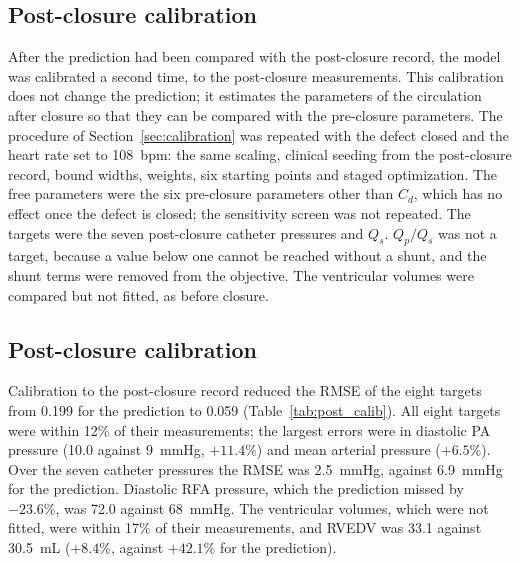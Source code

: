 %
%   


\subsection{Post-closure calibration}
\label{sec:post_calib_methods}
After the prediction had been compared with the post-closure record, the model was calibrated a second time, to the post-closure measurements. This calibration does not change the prediction; it estimates the parameters of the circulation after closure so that they can be compared with the pre-closure parameters. The procedure of Section~\ref{sec:calibration} was repeated with the defect closed and the heart rate set to 108~bpm: the same scaling, clinical seeding from the post-closure record, bound widths, weights, six starting points and staged optimization. The free parameters were the six pre-closure parameters other than $C_d$, which has no effect once the defect is closed; the sensitivity screen was not repeated. The targets were the seven post-closure catheter pressures and $Q_s$. $Q_p/Q_s$ was not a target, because a value below one cannot be reached without a shunt, and the shunt terms were removed from the objective. The ventricular volumes were compared but not fitted, as before closure.


\subsection{Post-closure calibration}
\label{sec:results_post_calib}
Calibration to the post-closure record reduced the RMSE of the eight targets from 0.199 for the prediction to 0.059 (Table~\ref{tab:post_calib}). All eight targets were within 12\% of their measurements; the largest errors were in diastolic PA pressure (10.0 against 9~mmHg, $+11.4\%$) and mean arterial pressure ($+6.5\%$). Over the seven catheter pressures the RMSE was 2.5~mmHg, against 6.9~mmHg for the prediction. Diastolic RFA pressure, which the prediction missed by $-23.6\%$, was 72.0 against 68~mmHg. The ventricular volumes, which were not fitted, were within 17\% of their measurements, and RVEDV was 33.1 against 30.5~mL ($+8.4\%$, against $+42.1\%$ for the prediction).

